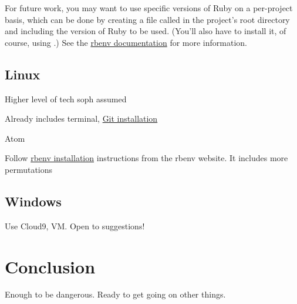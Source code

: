 For future work, you may want to use specific versions of Ruby on a per-project basis, which can be done by creating a file called  in the project's root directory and including the version of Ruby to be used. (You'll also have to install it, of course, using .) See the \href{https://github.com/rbenv/rbenv}{rbenv documentation} for more information.


\subsection{Linux} %
\label{sec:linux}

Higher level of tech soph assumed

Already includes terminal, \href{https://git-scm.com/download/linux}{Git installation}

Atom

Follow \href{https://github.com/rbenv/rbenv#installation}{rbenv installation} instructions from the rbenv website. It includes more permutations


\subsection{Windows} %
\label{sec:windows}

Use Cloud9, VM. Open to suggestions!



\section{Conclusion} %
\label{sec:conclusion}

Enough to be dangerous. Ready to get going on other things.

